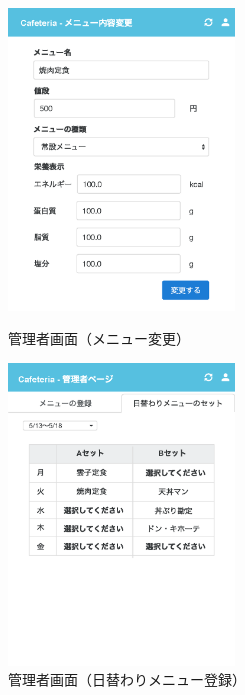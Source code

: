 \documentclass[a4paper]{ltjsarticle}
\begin{document}
    \begin{figure}[ht]
        \begin{minipage}[t]{.49\textwidth}
            \center
            \includegraphics[width=60mm]{ui/admin-modify-menu.png}
            \caption{管理者画面（メニュー変更）}
            \label{img:admin-modify-menu}
        \end{minipage}
        \begin{minipage}[t]{.49\textwidth}
            \center
            \includegraphics[width=60mm]{ui/admin-home-set-menu.png}
            \caption{管理者画面（日替わりメニュー登録）}
            \label{img:admin-home-set-menu}
        \end{minipage}
    \end{figure}
\end{document}
